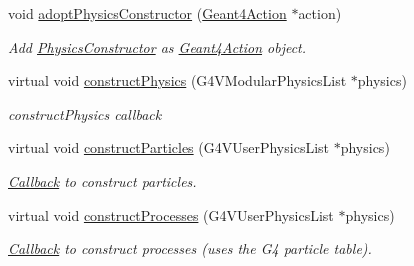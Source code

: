 \begin{DoxyCompactItemize}
void \hyperlink{class_d_d4hep_1_1_simulation_1_1_geant4_physics_list_a36fe7b7937ffd99c7300c63983d625eb}{adoptPhysicsConstructor} (\hyperlink{class_d_d4hep_1_1_simulation_1_1_geant4_action}{Geant4Action} $\ast$action)
\begin{DoxyCompactList}\small\item\em Add \hyperlink{class_d_d4hep_1_1_simulation_1_1_geant4_physics_list_1_1_physics_constructor}{PhysicsConstructor} as \hyperlink{class_d_d4hep_1_1_simulation_1_1_geant4_action}{Geant4Action} object. \item\end{DoxyCompactList}\item 
virtual void \hyperlink{class_d_d4hep_1_1_simulation_1_1_geant4_physics_list_ac930c930b12719772ec5119cdec72ef1}{constructPhysics} (G4VModularPhysicsList $\ast$physics)
\begin{DoxyCompactList}\small\item\em constructPhysics callback \item\end{DoxyCompactList}\item 
virtual void \hyperlink{class_d_d4hep_1_1_simulation_1_1_geant4_physics_list_ab9ccc4c7870b757576312feb8674236a}{constructParticles} (G4VUserPhysicsList $\ast$physics)
\begin{DoxyCompactList}\small\item\em \hyperlink{class_d_d4hep_1_1_callback}{Callback} to construct particles. \item\end{DoxyCompactList}\item 
virtual void \hyperlink{class_d_d4hep_1_1_simulation_1_1_geant4_physics_list_ae769a12f86a3cb785c1e040c5a32d8fb}{constructProcesses} (G4VUserPhysicsList $\ast$physics)
\begin{DoxyCompactList}\small\item\em \hyperlink{class_d_d4hep_1_1_callback}{Callback} to construct processes (uses the G4 particle table). \item\end{DoxyCompactList}\end{DoxyCompactItemize}

